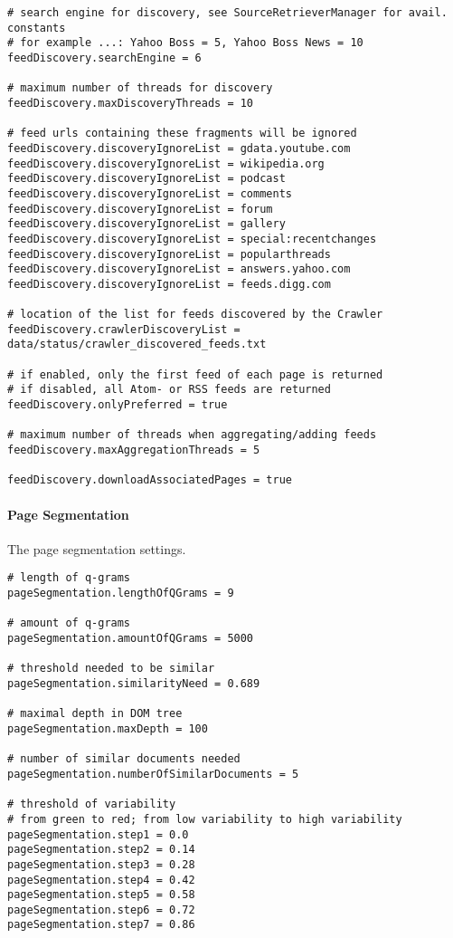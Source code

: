 \begin{verbatim}
# search engine for discovery, see SourceRetrieverManager for avail. constants
# for example ...: Yahoo Boss = 5, Yahoo Boss News = 10
feedDiscovery.searchEngine = 6

# maximum number of threads for discovery
feedDiscovery.maxDiscoveryThreads = 10

# feed urls containing these fragments will be ignored
feedDiscovery.discoveryIgnoreList = gdata.youtube.com
feedDiscovery.discoveryIgnoreList = wikipedia.org
feedDiscovery.discoveryIgnoreList = podcast
feedDiscovery.discoveryIgnoreList = comments
feedDiscovery.discoveryIgnoreList = forum
feedDiscovery.discoveryIgnoreList = gallery
feedDiscovery.discoveryIgnoreList = special:recentchanges
feedDiscovery.discoveryIgnoreList = popularthreads
feedDiscovery.discoveryIgnoreList = answers.yahoo.com
feedDiscovery.discoveryIgnoreList = feeds.digg.com

# location of the list for feeds discovered by the Crawler
feedDiscovery.crawlerDiscoveryList = data/status/crawler_discovered_feeds.txt

# if enabled, only the first feed of each page is returned
# if disabled, all Atom- or RSS feeds are returned
feedDiscovery.onlyPreferred = true

# maximum number of threads when aggregating/adding feeds
feedDiscovery.maxAggregationThreads = 5

feedDiscovery.downloadAssociatedPages = true
\end{verbatim}

\paragraph{Page Segmentation}
\label{par:pagesegmentation}
The page segmentation settings.

\begin{verbatim}
# length of q-grams
pageSegmentation.lengthOfQGrams = 9

# amount of q-grams
pageSegmentation.amountOfQGrams = 5000

# threshold needed to be similar
pageSegmentation.similarityNeed = 0.689

# maximal depth in DOM tree
pageSegmentation.maxDepth = 100

# number of similar documents needed
pageSegmentation.numberOfSimilarDocuments = 5

# threshold of variability
# from green to red; from low variability to high variability
pageSegmentation.step1 = 0.0
pageSegmentation.step2 = 0.14
pageSegmentation.step3 = 0.28
pageSegmentation.step4 = 0.42
pageSegmentation.step5 = 0.58
pageSegmentation.step6 = 0.72
pageSegmentation.step7 = 0.86
\end{verbatim}

